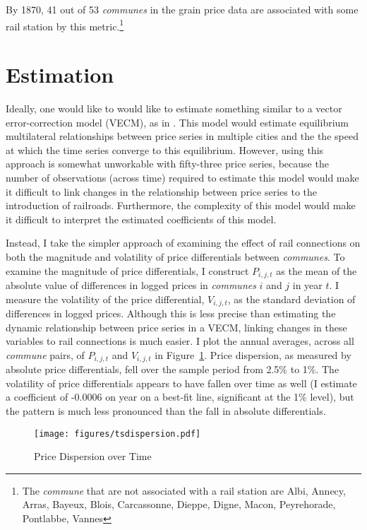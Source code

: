 \documentclass[12pt,twoside]{article}
\begin{document}
By 1870, 41 out of 53 \emph{communes} in the grain price data are associated with some rail station by this metric.\footnote{The \emph{commune} that are not associated with a rail station are Albi, Annecy, Arras, Bayeux, Blois, Carcassonne, Dieppe, Digne, Macon, Peyrehorade, Pontlabbe, Vannes}
	
\section{Estimation}

Ideally, one would like to would like to estimate something similar to a vector error-correction model (VECM), as in \cite{johansen}.
This model would estimate equilibrium multilateral relationships between price series in multiple cities and the the speed at which the time series converge to this equilibrium.
However, using this approach is somewhat unworkable with fifty-three price series, because the number of observations (across time) required to estimate this model would make it difficult to link changes in the relationship between price series to the introduction of railroads.
Furthermore, the complexity of this model would make it difficult to interpret the estimated coefficients of this model.

Instead, I take the simpler approach of examining the effect of rail connections on both the magnitude and volatility of price differentials between \emph{communes}.
To examine the magnitude of price differentials, I construct $P_{i,j,t}$ as the mean of the absolute value of differences in logged prices in \emph{communes} $i$ and $j$ in year $t$.
I measure the volatility of the price differential, $V_{i,j,t}$, as the standard deviation of differences in logged prices.
Although this is less precise than estimating the dynamic relationship between price series in a VECM, linking changes in these variables to rail connections is much easier.
I plot the annual averages, across all \emph{commune} pairs, of $P_{i,j,t}$ and $V_{i,j,t}$ in Figure~\ref{fig:tsdifferentials}.
Price dispersion, as measured by absolute price differentials, fell over the sample period from 2.5\% to 1\%.
The volatility of price differentials appears to have fallen over time as well (I estimate a coefficient of -0.0006 on year on a best-fit line, significant at the 1\% level), but the pattern is much less pronounced than the fall in absolute differentials.

\begin{figure}[ht]
	\caption{Price Dispersion over Time}
	\texttt{[image: figures/tsdispersion.pdf]}
	\label{fig:tsdifferentials}
\end{figure}
\end{document}
